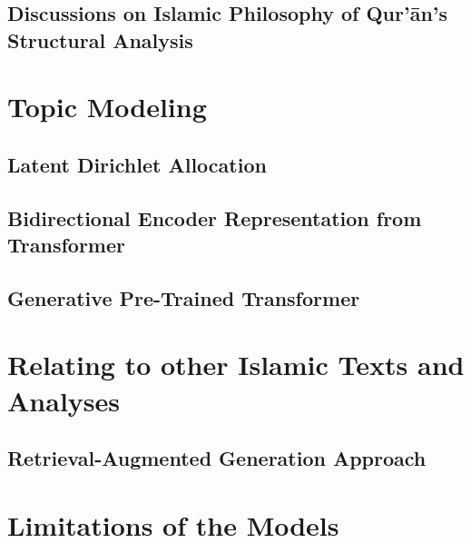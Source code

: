 \subsection{Discussions on Islamic Philosophy of Qur'\=an's Structural Analysis}
\newpage
\section{Topic Modeling}\label{sec:ch4_topic_modeling_result}
\subsection{Latent Dirichlet Allocation}
\subsection{Bidirectional Encoder Representation from Transformer}
\subsection{Generative Pre-Trained Transformer}
\section{Relating to other Islamic Texts and Analyses}\label{sec:ch4_relating_islamic_texts}
\subsection{Retrieval-Augmented Generation Approach}
\section{Limitations of the Models}